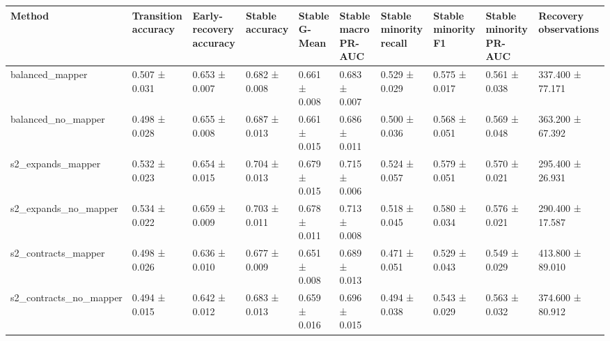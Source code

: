 \begin{tabular}{llllllllll}
\toprule
Method & Transition accuracy & Early-recovery accuracy & Stable accuracy & Stable G-Mean & Stable macro PR-AUC & Stable minority recall & Stable minority F1 & Stable minority PR-AUC & Recovery observations \\
\midrule
balanced\_mapper & 0.507 ± 0.031 & 0.653 ± 0.007 & 0.682 ± 0.008 & 0.661 ± 0.008 & 0.683 ± 0.007 & 0.529 ± 0.029 & 0.575 ± 0.017 & 0.561 ± 0.038 & 337.400 ± 77.171 \\
balanced\_no\_mapper & 0.498 ± 0.028 & 0.655 ± 0.008 & 0.687 ± 0.013 & 0.661 ± 0.015 & 0.686 ± 0.011 & 0.500 ± 0.036 & 0.568 ± 0.051 & 0.569 ± 0.048 & 363.200 ± 67.392 \\
s2\_expands\_mapper & 0.532 ± 0.023 & 0.654 ± 0.015 & 0.704 ± 0.013 & 0.679 ± 0.015 & 0.715 ± 0.006 & 0.524 ± 0.057 & 0.579 ± 0.051 & 0.570 ± 0.021 & 295.400 ± 26.931 \\
s2\_expands\_no\_mapper & 0.534 ± 0.022 & 0.659 ± 0.009 & 0.703 ± 0.011 & 0.678 ± 0.011 & 0.713 ± 0.008 & 0.518 ± 0.045 & 0.580 ± 0.034 & 0.576 ± 0.021 & 290.400 ± 17.587 \\
s2\_contracts\_mapper & 0.498 ± 0.026 & 0.636 ± 0.010 & 0.677 ± 0.009 & 0.651 ± 0.008 & 0.689 ± 0.013 & 0.471 ± 0.051 & 0.529 ± 0.043 & 0.549 ± 0.029 & 413.800 ± 89.010 \\
s2\_contracts\_no\_mapper & 0.494 ± 0.015 & 0.642 ± 0.012 & 0.683 ± 0.013 & 0.659 ± 0.016 & 0.696 ± 0.015 & 0.494 ± 0.038 & 0.543 ± 0.029 & 0.563 ± 0.032 & 374.600 ± 80.912 \\
\bottomrule
\end{tabular}
